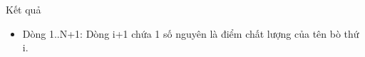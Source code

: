 Kết quả
\begin{itemize}
	\item     Dòng 1..N+1: Dòng i+1 chứa 1 số nguyên là điểm chất lượng của tên bò thứ i.   
\end{itemize}